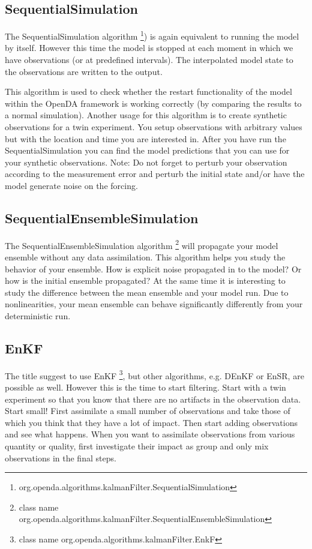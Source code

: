 \documentclass[a4paper,10pt]{article}
\begin{document}
\subsection{SequentialSimulation}
The SequentialSimulation algorithm \footnote{org.openda.algorithms.kalmanFilter.SequentialSimulation}) is again equivalent to running the model by itself. However this time the model is stopped at each moment in which we have observations (or at predefined intervals).  The interpolated model state to the observations are written to the output. 

This algorithm is used to check whether the restart functionality of the model within the OpenDA framework is working correctly (by comparing the results to a normal simulation). Another usage for this algorithm is to create synthetic observations for a twin experiment. You setup observations with arbitrary values but with the location and time you are interested in. After you have run the SequentialSimulation you can find the model predictions that you can use for your synthetic observations. Note: Do not forget to perturb your observation according to the measurement error and perturb the initial state and/or have the model generate noise on the forcing.

\subsection{SequentialEnsembleSimulation}\label{Sec:SequentialEnsembleSimulation}
The SequentialEnsembleSimulation algorithm \footnote{class name org.openda.algorithms.kalmanFilter.SequentialEnsembleSimulation} will propagate your model ensemble without any data assimilation. This algorithm helps you study the behavior of your ensemble. How is explicit noise propagated in to the model? Or how is the initial ensemble propagated? At the same time it is interesting to study the difference between the mean ensemble and your model run. Due to nonlinearities, your mean ensemble can behave significantly differently from your deterministic run.

\subsection{EnKF}
The title suggest to use EnKF  \footnote{class name org.openda.algorithms.kalmanFilter.EnkF}, but other algorithms, e.g. DEnKF or EnSR, are possible as well. However this is the time to start filtering. Start with a twin experiment so that you know that there are no artifacts in the observation data. Start small! First assimilate a small number of observations and take those of which you think that they have a lot of impact. Then start adding observations and see what happens. When you want to assimilate observations from various quantity or quality, first investigate their impact as group and only mix observations in the final steps.
\end{document}
